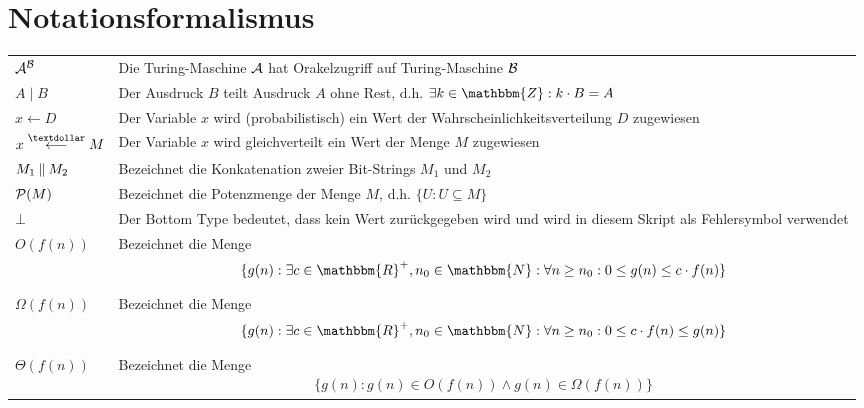 \section{Notationsformalismus}
\begin{tabularx}{\textwidth}{ p{} | X }
	$\mathcal{A}^{\mathcal{B}}$ & Die Turing-Maschine $\mathcal{A}$ hat Orakelzugriff auf Turing-Maschine $\mathcal{B}$\\
	$A \mid B$ & Der Ausdruck $B$ teilt Ausdruck $A$ ohne Rest, d.h. $\exists k \in \mathbbm{Z} : k \cdot B = A$\\
	$x \leftarrow D$ & Der Variable $x$ wird (probabilistisch) ein Wert der Wahrscheinlichkeitsverteilung $D$ zugewiesen\\
	$x \stackrel{\textdollar}{\longleftarrow} M$ & Der Variable $x$ wird gleichverteilt ein Wert der Menge $M$ zugewiesen\\
	$M_1 \mathbin{\|} M_2$ & Bezeichnet die Konkatenation zweier Bit-Strings $M_1$ und $M_2$\\
	$\mathcal{P}(M)$ & Bezeichnet die Potenzmenge der Menge $M$, d.h. $\{U : U \subseteq M\}$\\
	$\bot$ & Der Bottom Type bedeutet, dass kein Wert zurückgegeben wird und wird in diesem Skript als Fehlersymbol verwendet\\
	$O(f(n))$ & Bezeichnet die Menge
	\begin{align*}
		\{g(n) : \exists c \in \mathbbm{R}^{+}, n_0 \in \mathbbm{N} : \forall n \geq n_0 : 0 \leq g(n) \leq c \cdot f(n)\}
	\end{align*}\\
	$\Omega(f(n))$ & Bezeichnet die Menge
	\begin{align*}
		\{g(n) : \exists c \in \mathbbm{R}^{+}, n_0 \in \mathbbm{N} : \forall n \geq n_0 : 0 \leq c \cdot f(n) \leq g(n)\}
	\end{align*}\\
	$\Theta(f(n))$ & Bezeichnet die Menge
	\begin{align*}
		\{g(n) : g(n) \in O(f(n)) \land g(n) \in \Omega(f(n))\}
	\end{align*}\\
\end{tabularx}

